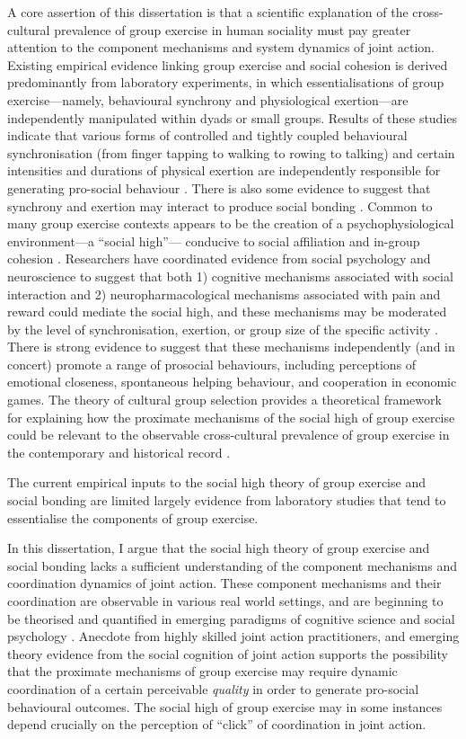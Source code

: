 A core assertion of this dissertation is that a scientific explanation of the cross-cultural prevalence of group exercise in human sociality must pay greater attention to the component mechanisms and system dynamics of joint action.  Existing empirical evidence linking group exercise and social cohesion is derived predominantly from laboratory experiments, in which essentialisations of group exercise---namely, behavioural synchrony and physiological exertion---are independently manipulated within dyads or small groups.  Results of these studies indicate that various forms of controlled and tightly coupled  behavioural synchronisation (from finger tapping to walking to rowing to talking) and certain intensities and durations of physical exertion are independently responsible for generating pro-social behaviour \citep{Tarr2015}.  There is also some evidence to suggest that synchrony and exertion may interact to produce social bonding \citep{Lewis2018}.  Common to many group exercise contexts appears to be the creation of a psychophysiological environment---a ``social high''--- conducive to social affiliation and in-group cohesion \citep{Davis2015}. Researchers have coordinated evidence from social psychology and neuroscience to suggest that both 1) cognitive mechanisms associated with social interaction and 2) neuropharmacological mechanisms associated with pain and reward could mediate the social high, and these mechanisms may be moderated by the level of synchronisation, exertion, or group size of the specific activity \citep{Mogan2017}. There is strong evidence to suggest that these mechanisms independently (and in concert) promote a range of prosocial behaviours, including perceptions of emotional closeness, spontaneous helping behaviour, and cooperation in economic games. The theory of cultural group selection provides a theoretical framework for explaining how the proximate mechanisms of the social high of group exercise could be relevant to the observable cross-cultural prevalence of group exercise in the contemporary and historical record \citep{Dunbar2010,Whitehouse2014a}.

The current empirical inputs to the social high theory of group exercise and social bonding are limited largely evidence from laboratory studies that tend to essentialise the components of group exercise.

In this dissertation, I argue that the social high theory of group exercise and social bonding lacks a sufficient understanding of the component mechanisms and coordination dynamics of joint action.  These component mechanisms and their coordination are observable in various real world settings, and are beginning to be theorised and quantified in emerging paradigms of cognitive science and social psychology \citep{Marsh2009}.  Anecdote from highly skilled joint action practitioners, and emerging theory evidence from the social cognition of joint action supports the possibility that the proximate mechanisms of group exercise may require dynamic coordination of a certain perceivable \textit{quality} in order to generate pro-social behavioural outcomes.  The social high of group exercise may in some instances depend crucially on the perception of ``click'' of coordination in joint action.

